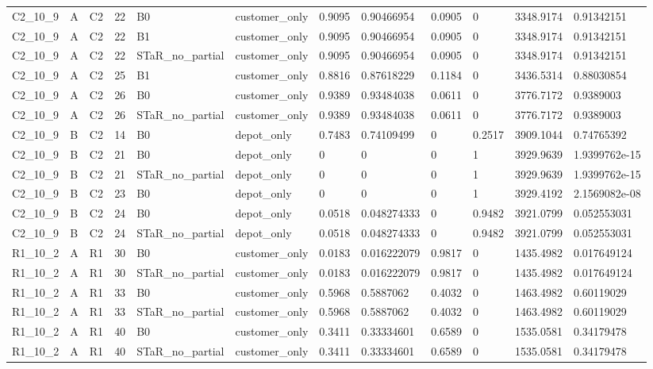 \begin{longtable}{llllllllllll}
C2\_10\_9 & A & C2 & 22 & B0 & customer\_only & 0.9095 & 0.90466954 & 0.0905 & 0 & 3348.9174 & 0.91342151 \\
C2\_10\_9 & A & C2 & 22 & B1 & customer\_only & 0.9095 & 0.90466954 & 0.0905 & 0 & 3348.9174 & 0.91342151 \\
C2\_10\_9 & A & C2 & 22 & STaR\_no\_partial & customer\_only & 0.9095 & 0.90466954 & 0.0905 & 0 & 3348.9174 & 0.91342151 \\
C2\_10\_9 & A & C2 & 25 & B1 & customer\_only & 0.8816 & 0.87618229 & 0.1184 & 0 & 3436.5314 & 0.88030854 \\
C2\_10\_9 & A & C2 & 26 & B0 & customer\_only & 0.9389 & 0.93484038 & 0.0611 & 0 & 3776.7172 & 0.9389003 \\
C2\_10\_9 & A & C2 & 26 & STaR\_no\_partial & customer\_only & 0.9389 & 0.93484038 & 0.0611 & 0 & 3776.7172 & 0.9389003 \\
C2\_10\_9 & B & C2 & 14 & B0 & depot\_only & 0.7483 & 0.74109499 & 0 & 0.2517 & 3909.1044 & 0.74765392 \\
C2\_10\_9 & B & C2 & 21 & B0 & depot\_only & 0 & 0 & 0 & 1 & 3929.9639 & 1.9399762e-15 \\
C2\_10\_9 & B & C2 & 21 & STaR\_no\_partial & depot\_only & 0 & 0 & 0 & 1 & 3929.9639 & 1.9399762e-15 \\
C2\_10\_9 & B & C2 & 23 & B0 & depot\_only & 0 & 0 & 0 & 1 & 3929.4192 & 2.1569082e-08 \\
C2\_10\_9 & B & C2 & 24 & B0 & depot\_only & 0.0518 & 0.048274333 & 0 & 0.9482 & 3921.0799 & 0.052553031 \\
C2\_10\_9 & B & C2 & 24 & STaR\_no\_partial & depot\_only & 0.0518 & 0.048274333 & 0 & 0.9482 & 3921.0799 & 0.052553031 \\
R1\_10\_2 & A & R1 & 30 & B0 & customer\_only & 0.0183 & 0.016222079 & 0.9817 & 0 & 1435.4982 & 0.017649124 \\
R1\_10\_2 & A & R1 & 30 & STaR\_no\_partial & customer\_only & 0.0183 & 0.016222079 & 0.9817 & 0 & 1435.4982 & 0.017649124 \\
R1\_10\_2 & A & R1 & 33 & B0 & customer\_only & 0.5968 & 0.5887062 & 0.4032 & 0 & 1463.4982 & 0.60119029 \\
R1\_10\_2 & A & R1 & 33 & STaR\_no\_partial & customer\_only & 0.5968 & 0.5887062 & 0.4032 & 0 & 1463.4982 & 0.60119029 \\
R1\_10\_2 & A & R1 & 40 & B0 & customer\_only & 0.3411 & 0.33334601 & 0.6589 & 0 & 1535.0581 & 0.34179478 \\
R1\_10\_2 & A & R1 & 40 & STaR\_no\_partial & customer\_only & 0.3411 & 0.33334601 & 0.6589 & 0 & 1535.0581 & 0.34179478 \\

\end{longtable}
